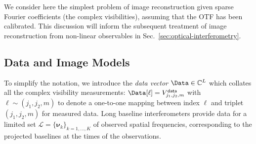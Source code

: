 \documentclass{article}
\newcommand{\Tag}[1]{\mathsf{#1}}        %
\newcommand{\V}[1]{\boldsymbol{#1}}      %
\newcommand{\avg}[1]{\langle #1\rangle}
\newcommand{\Complexes}{\mathbb{C}}
\newcommand{\bydef}{\stackrel{\mathrm{def}}{=}}
\newcommand{\etc}{etc.\xspace}
\newcommand{\ComplexVis}{V}
\newcommand{\Freq}{\nu}               %
\newcommand{\VFreq}{\V{\Freq}}
\newcommand{\Posn}{r}                 %
\newcommand{\VPosn}{\V{\Posn}}
\newcommand{\FreqSet}{\mathcal{L}}  %
\newcommand{\BaseSet}{\mathcal{B}}  %
\newcommand{\ApertureList}{\mathcal{A}} %
\newcommand{\ExposureList}{\mathcal{E}} %
\newcommand{\DataTag}{\Tag{data}}
\begin{document}
We consider here the simplest problem of image reconstruction given sparse
Fourier coefficients (the complex visibilities), assuming that the OTF has
been calibrated. This discussion will inform the subsequent treatment of image
reconstruction from non-linear observables in
Sec.~\ref{sec:optical-interferometry}.


\subsection{Data and Image Models}
\label{sec:models}

To simplify the notation, we introduce the \emph{data vector}
$\Data\in\Complexes^L$ which collates all the complex visibility measurements:
$\Data[\ell]=\ComplexVis_{j_1,j_2,m}^\DataTag$ with $\ell\sim(j_1,j_2,m)$ to
denote a one-to-one mapping between index $\ell$ and triplet $(j_1,j_2,m)$ for
measured data. Long baseline interferometers provide data for a limited set
$\FreqSet=\{\VFreq_k\}_{k=1,\ldots,K}$ of observed spatial frequencies,
corresponding to the projected baselines at the times of the observations.

\end{document}
